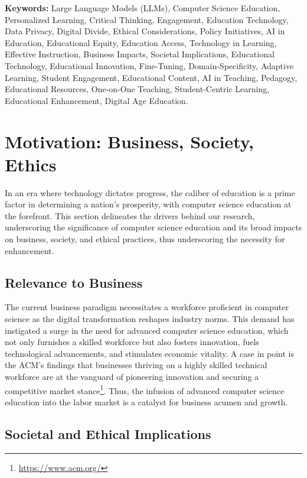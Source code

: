\documentclass[]{article}
\begin{document}
\noindent\textbf{Keywords:} Large Language Models (LLMs), Computer Science Education, Personalized Learning, Critical Thinking, Engagement, Education Technology, Data Privacy, Digital Divide, Ethical Considerations, Policy Initiatives, AI in Education, Educational Equity, Education Access, Technology in Learning, Effective Instruction, Business Impacts, Societal Implications, Educational Technology, Educational Innovation, Fine-Tuning, Domain-Specificity, Adaptive Learning, Student Engagement, Educational Content, AI in Teaching, Pedagogy, Educational Resources, One-on-One Teaching, Student-Centric Learning, Educational Enhancement, Digital Age Education.

\section{Motivation: Business, Society, Ethics}

In an era where technology dictates progress, the caliber of education is a prime factor in determining a nation's prosperity, with computer science education at the forefront. This section delineates the drivers behind our research, underscoring the significance of computer science education and its broad impacts on business, society, and ethical practices, thus underscoring the necessity for enhancement.

\subsection{Relevance to Business}

The current business paradigm necessitates a workforce proficient in computer science as the digital transformation reshapes industry norms. This demand has instigated a surge in the need for advanced computer science education, which not only furnishes a skilled workforce but also fosters innovation, fuels technological advancements, and stimulates economic vitality. A case in point is the ACM's findings that businesses thriving on a highly skilled technical workforce are at the vanguard of pioneering innovation and securing a competitive market stance\footnote{\url{https://www.acm.org/}}. Thus, the infusion of advanced computer science education into the labor market is a catalyst for business acumen and growth.

\subsection{Societal and Ethical Implications}
\end{document}
